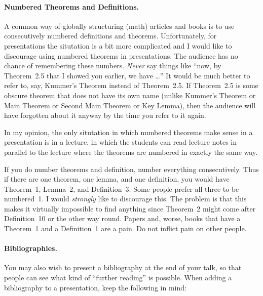 \paragraph{Numbered Theorems and Definitions.}

A common way of globally structuring (math) articles and books is to
use consecutively numbered definitions and theorems. Unfortunately,
for presentations the situtation is a bit more complicated and I would
like to discourage using numbered theorems in presentations. The
audience has no chance of remembering these numbers. \emph{Never} say
things like ``now, by Theorem~2.5 that I showed you earlier, we have
\dots'' It would be much better to refer to, say, Kummer's Theorem
instead of Theorem~2.5. If Theorem~2.5 is some obscure theorem that
does not have its own name (unlike Kummer's Theorem or Main Theorem or
Second Main Theorem or Key Lemma), then the audience will have
forgotten about it anyway by the time you refer to it again.

In my opinion, the only situtation in which numbered theorems make
sense in a presentation is in a lecture, in which the students can read
lecture notes in parallel to the lecture where the theorems are
numbered in exactly the same way.

If you do number theorems and definition, number everything
consecutively. Thus if there are one theorem, one lemma, 
and one definition, you would have Theorem~1, Lemma~2, and
Definition~3. Some people prefer all three to be numbered~1. I would
\emph{strongly} like to discourage this. The problem is that this
makes it virtually impossible to find anything since Theorem~2 might
come after Definition~10 or the other way round. Papers and, worse,
books that have a Theorem~1 and a Definition~1 are a pain. Do not
inflict pain on other people. 



\paragraph{Bibliographies.}

You may also wish to present a bibliography at the end of your talk,
so that people can see what kind of ``further reading'' is possible. 
When adding a bibliography to a presentation, keep the following in mind:

